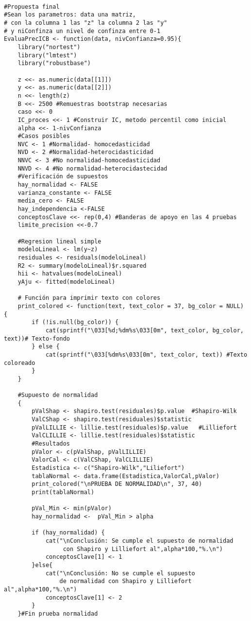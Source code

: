 \begin{verbatim}

#Propuesta final
#Sean los parametros: data una matriz,
# con la columna 1 las "z" la columna 2 las "y" 
# y niConfinza un nivel de confinza entre 0-1
EvaluaPrecICB <- function(data, nivConfianza=0.95){
	library("nortest")
	library("lmtest")
	library("robustbase")
	
	z <<- as.numeric(data[[1]])
	y <<- as.numeric(data[[2]])
	n <<- length(z)
	B <<- 2500 #Remuestras bootstrap necesarias
	caso <<- 0
	IC_proces <<- 1 #Construir IC, metodo percentil como inicial
	alpha <<- 1-nivConfianza
	#Casos posibles
	NVC <- 1 #Normalidad- homocedasticidad
	NVD <- 2 #Normalidad-heterocidasticidad
	NNVC <- 3 #No normalidad-homocedasticidad
	NNVD <- 4 #No normalidad-heterocidastecidad 
	#Verificación de supuestos
	hay_normalidad <- FALSE
	varianza_constante <- FALSE
	media_cero <- FALSE
	hay_independencia <-FALSE
	conceptosClave <<- rep(0,4) #Banderas de apoyo en las 4 pruebas
	limite_precision <<-0.7
	
	#Regresion lineal simple
	modeloLineal <- lm(y~z)
	residuales <- residuals(modeloLineal)
	R2 <- summary(modeloLineal)$r.squared
	hii <- hatvalues(modeloLineal)
	yAju <- fitted(modeloLineal)
	
	# Función para imprimir texto con colores 
	print_colored <- function(text, text_color = 37, bg_color = NULL) {
		if (!is.null(bg_color)) {
			cat(sprintf("\033[%d;%dm%s\033[0m", text_color, bg_color, text))# Texto-fondo
		} else {
			cat(sprintf("\033[%dm%s\033[0m", text_color, text)) #Texto coloreado
		}
	}
	
	#Supuesto de normalidad
	{
		pValShap <- shapiro.test(residuales)$p.value  #Shapiro-Wilk
		ValCShap <- shapiro.test(residuales)$statistic
		pValLILLIE <- lillie.test(residuales)$p.value   #Lilliefort
		ValCLILLIE <- lillie.test(residuales)$statistic
		#Resultados
		pValor <- c(pValShap, pValLILLIE)
		ValorCal <- c(ValCShap, ValCLILLIE)
		Estadistica <- c("Shapiro-Wilk","Liliefort")
		tablaNormal <- data.frame(Estadistica,ValorCal,pValor)
		print_colored("\nPRUEBA DE NORMALIDAD\n", 37, 40)
		print(tablaNormal)
		
		pVal_Min <- min(pValor)
		hay_normalidad <-  pVal_Min > alpha
		
		if (hay_normalidad) {
			cat("\nConclusión: Se cumple el supuesto de normalidad
				 con Shapiro y Lilliefort al",alpha*100,"%.\n")
			conceptosClave[1] <- 1
		}else{
			cat("\nConclusión: No se cumple el supuesto 
				de normalidad con Shapiro y Lilliefort al",alpha*100,"%.\n")
			conceptosClave[1] <- 2
		}
	}#Fin prueba normalidad
	

\end{verbatim}
